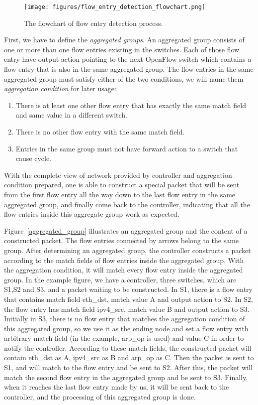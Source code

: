 \begin{figure}[H]
\begin{center} 
\texttt{[image: figures/flow\_entry\_detection\_flowchart.png]}
\end{center}
\caption{The flowchart of flow entry detection process.}
\label{flow_entry_detection_flowchart}
\end{figure}

First, we have to define the \textit{aggregated groups}. An aggregated group consists of one or more than one flow entries existing in the switches. Each of those flow entry have output action pointing to the next OpenFlow switch which contains a flow entry that is also in the same aggregated group. The flow entries in the same aggregated group must satisfy either of the two conditions, we will name them \textit{aggregation condition} for later usage: 
\begin{enumerate}
\item
There is at least one other flow entry that has exactly the same match field and same value in a different switch.
\item
There is no other flow entry with the same match field.
\item
Entries in the same group must not have forward action to a switch that cause cycle.
\end{enumerate}

With the complete view of network provided by controller and aggregation condition prepared, one is able to construct a special packet that will be sent from the first flow entry all the way down to the last flow entry in the same aggregated group, and finally come back to the controller, indicating that all the flow entries inside this aggregate group work as expected. 

Figure~\ref{aggregated_group} illustrates an aggregated group and the content of a constructed packet. The flow entries connected by arrows belong to the same group. After determining an aggregated group, the controller constructs a packet according to the match fields of flow entries inside the aggregated group. With the aggregation condition, it will match every flow entry inside the aggregated group. In the example figure, we have a controller, three switches, which are S1,S2 and S3, and a packet waiting to be constructed. In S1, there is a flow entry that contains match field eth\_dst, match value A and output action to S2. In S2, the flow entry has match field ipv4\_src, match value B and output action to S3. Initially in S3, there is no flow entry that matches the aggregation condition of this aggregated group, so we use it as the ending node and set a flow entry with arbitrary match field (in the example, arp\_op is used) and value C in order to notify the controller. According to these match fields, the constructed packet will contain eth\_dst as A, ipv4\_src as B and arp\_op as C. Then the packet is sent to S1, and will match to the flow entry and be sent to S2. After this, the packet will match the second flow entry in the aggregated group and be sent to S3. Finally, when it reaches the last flow entry made by us, it will be sent back to the controller, and the processing of this aggregated group is done.

